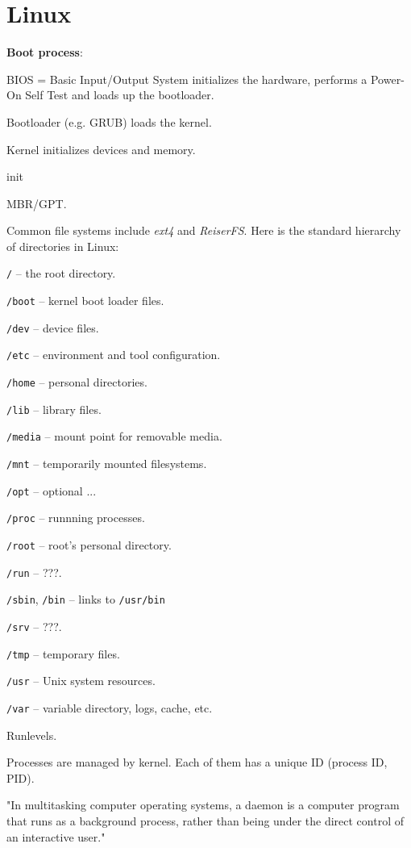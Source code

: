 \section{Linux}
\textbf{Boot process}:
\begin{enumx}
	\item BIOS = Basic Input/Output System initializes the hardware, performs a Power-On Self Test and loads up the bootloader.
	\item Bootloader (e.g. GRUB) loads the kernel.
	\item Kernel initializes devices and memory.
	\item init
\end{enumx}

MBR/GPT. 

Common file systems include \emph{ext4} and \emph{ReiserFS}.
Here is the standard hierarchy of directories in Linux:
\begin{itemx}
\item \texttt{/} -- the root directory.
\item \texttt{/boot} -- kernel boot loader files.
\item \texttt{/dev} -- device files.
\item \texttt{/etc} -- environment and tool configuration.
\item \texttt{/home} -- personal directories.
\item \texttt{/lib} -- library files.
\item \texttt{/media} -- mount point for removable media.
\item \texttt{/mnt} -- temporarily mounted filesystems.
\item \texttt{/opt} -- optional ...
\item \texttt{/proc} -- runnning processes.
\item \texttt{/root} -- root's personal directory.
\item \texttt{/run} -- ???.
\item \texttt{/sbin}, \texttt{/bin} -- links to \texttt{/usr/bin}
\item \texttt{/srv} -- ???.
\item \texttt{/tmp} --  temporary files.
\item \texttt{/usr} -- Unix system resources.
\item \texttt{/var} -- variable directory, logs, cache, etc.
\end{itemx}

Runlevels.

Processes are managed by kernel. Each of them has a unique ID (process ID, PID).

"In multitasking computer operating systems, a daemon is a computer program that runs as a background process, rather than being under the direct control of an interactive user."